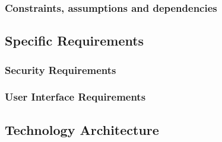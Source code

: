 \subsubsection{Constraints, assumptions and dependencies}

% 

\subsection{Specific Requirements}

\subsubsection{Security Requirements}

\subsubsection{User Interface Requirements}

\subsection{Technology Architecture}
